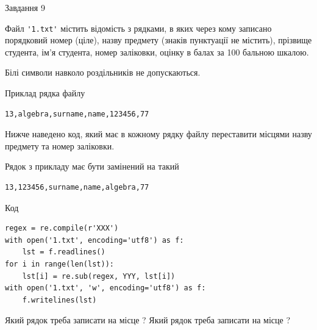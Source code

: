 \documentclass[12pt, ukrainian]{article}
\def\code#1{\Verb!#1!}
\begin{document}
{\begin{minipage}[t]{8.0cm}
\end{minipage}

               
{\begin{center}Завдання {9}\end{center}}
\vspace{-4mm}
Файл \code{'1.txt'} містить відомість з рядками, в яких через кому записано поряд\-ковий номер (ціле), назву предмету (знаків пунктуації не містить), прізвище студента, ім'я студента, номер заліковки, оцінку в балах за 100 бальною шкалою.

Білі символи навколо роздільників не допускаються.

Приклад рядка файлу



\begin{verbatim}
13,algebra,surname,name,123456,77
\end{verbatim}


Нижче наведено код, який має в кожному рядку файлу переставити місцями назву предмету та номер заліковки.

Рядок з прикладу має бути замінений на такий



\begin{verbatim}
13,123456,surname,name,algebra,77
\end{verbatim}




Код



\begin{verbatim}
regex = re.compile(r'XXX')
with open('1.txt', encoding='utf8') as f:
    lst = f.readlines()
for i in range(len(lst)):
    lst[i] = re.sub(regex, YYY, lst[i])
with open('1.txt', 'w', encoding='utf8') as f:
    f.writelines(lst)
\end{verbatim}





Який рядок треба записати на місце  ?
Який рядок треба записати на місце  ?\par

}
\end{document}
